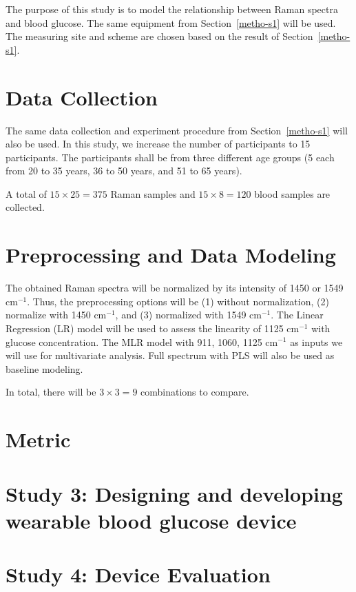 The purpose of this study is to model the relationship between Raman spectra and blood glucose.
The same equipment from Section~\ref{metho-s1} will be used.
The measuring site and scheme are chosen based on the result of Section~\ref{metho-s1}.

\section{Data Collection}

The same data collection and experiment procedure from Section~\ref{metho-s1} will also be used.
In this study, we increase the number of participants to 15 participants.
The participants shall be from three different age groups (5 each from 20 to 35 years, 36 to 50 years, and 51 to 65 years).

A total of $15 \times 25 =  375$ Raman samples and $15 \times 8 = 120$ blood samples are collected.

\section{Preprocessing and Data Modeling}

The obtained Raman spectra will be normalized by its intensity of 1450 or 1549 $\text{cm}^{-1}$.
Thus, the preprocessing options will be (1) without normalization, (2) normalize with 1450 $\text{cm}^{-1}$, and (3) normalized with 1549 $\text{cm}^{-1}$.
The Linear Regression (LR) model will be used to assess the linearity of 1125 $\text{cm}^{-1}$ with glucose concentration.
The MLR model with 911, 1060, 1125 $\text{cm}^{-1}$ as inputs we will use for multivariate analysis.
Full spectrum with PLS will also be used as baseline modeling.

In total, there will be $3 \times 3 = 9$ combinations to compare.

\section{Metric}



\section{Study 3: Designing and developing wearable blood glucose device}


\section{Study 4: Device Evaluation}
